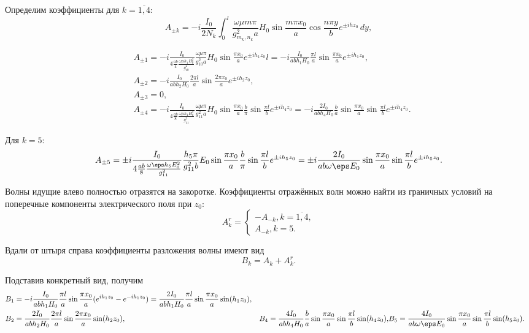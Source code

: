 \documentclass[a4paper,14pt]{extarticle}
\begin{document}
	Определим коэффициенты для \( k = \overline{1,4} \):
	\[
		A_{\pm k} = -i\frac{I_0}{2N_k} \int_0^l \frac{\omega\mu m\pi}{g_{m_k,n_k}^2a}H_0\sin\frac{m\pi x_0}{a}\cos\frac{n\pi y}{b}e^{\pm ihz_0}\,dy,
	\]

	\begin{align*}
		& A_{\pm 1} = -i\frac{I_0}{4\frac{ab}{4}\frac{\omega\mu h_1 H_0^2}{g_{10}^2}} \frac{\omega\mu \pi}{g_{10}^2a}H_0\sin\frac{\pi x_0}{a}e^{\pm ih_1z_0}l = -i\frac{I_0}{ab h_1 H_0} \frac{\pi l}{a}\sin\frac{\pi x_0}{a}e^{\pm ih_1z_0},\\
		& A_{\pm 2} = -i\frac{I_0}{ab h_2 H_0} \frac{2\pi l}{a}\sin\frac{2\pi x_0}{a}e^{\pm ih_2z_0},\\
		& A_{\pm 3} = 0,\\
		& A_{\pm 4} = -i\frac{I_0}{4\frac{ab}{8}\frac{\omega\mu h_4 H_0^2}{g_{11}^2}} \frac{\omega\mu \pi}{g_{11}^2a}H_0\sin\frac{\pi x_0}{a}\frac{b}{\pi}\sin\frac{\pi l}{b}e^{\pm ih_4z_0} = -i\frac{2I_0}{ab h_4 H_0} \frac{b}{a}\sin\frac{\pi x_0}{a}\sin\frac{\pi l}{b}e^{\pm ih_4z_0}.
	\end{align*}

	Для \( k = 5 \):
	\[
		A_{\pm 5} =  \pm i\frac{I_0}{4\frac{ab}{8}\frac{\omega\eps h_5 E_0^2}{g_{11}^2}}\frac{h_5\pi}{g_{11}^2b}E_0\sin\frac{\pi x_0}{a}\frac{b}{\pi}\sin\frac{\pi l}{b}e^{\pm ih_5z_0} = \pm i \frac{2I_0}{ab\omega\eps E_0} \sin\frac{\pi x_0}{a}\sin\frac{\pi l}{b}e^{\pm ih_5z_0}.
	\]

	Волны идущие влево полностью отразятся на закоротке. Коэффициенты отражённых волн можно найти из граничных условий на поперечные компоненты электрического поля при \( z_0 \):
	\[
		A_k^r = \begin{cases}
			-A_{-k}, k=\overline{1,4},\\
			A_{-k}, k=5.
		\end{cases}
	\]

	Вдали от штыря справа коэффициенты разложения волны имеют вид
	\[
		B_k = A_k + A_k^r.
	\]

	Подставив конкретный вид, получим
	\begin{align*}
		& B_1 = -i\frac{I_0}{ab h_1 H_0} \frac{\pi l}{a}\sin\frac{\pi x_0}{a}(e^{ih_1z_0}  - e^{-ih_1z_0}) = \frac{2I_0}{ab h_1 H_0} \frac{\pi l}{a}\sin\frac{\pi x_0}{a}\sin(h_1z_0),\\
		& B_2 = \frac{2I_0}{ab h_2 H_0} \frac{2\pi l}{a}\sin\frac{2\pi x_0}{a}\sin(h_2z_0),
		& B_4 = \frac{4I_0}{ab h_4 H_0} \frac{b}{a}\sin\frac{\pi x_0}{a}\sin\frac{\pi l}{b}\sin(h_4z_0),
		& B_5 = \frac{4I_0}{ab\omega\eps E_0} \sin\frac{\pi x_0}{a}\sin\frac{\pi l}{b}\sin(h_5z_0).
	\end{align*}
\end{document}
